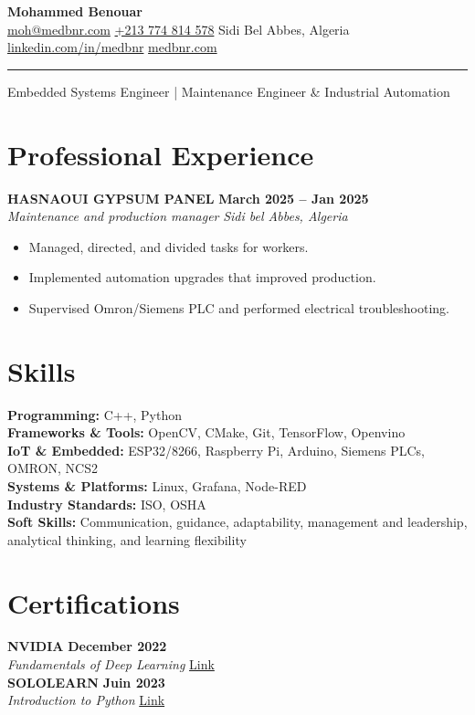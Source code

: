 \documentclass[11pt,a4paper]{article}
\begin{document}
\noindent
{\LARGE \textbf{Mohammed Benouar}} \\[0.3em]
\href{mailto:moh@medbnr.com}{moh@medbnr.com} \textbar{} 
\href{tel:+213774814578}{+213 774 814 578} \textbar{} 
Sidi Bel Abbes, Algeria \textbar{} 
\href{https://www.linkedin.com/in/medbnr/}{linkedin.com/in/medbnr} \textbar{} 
\href{https://medbnr.com}{medbnr.com}
\\[-.5em]\rule{\textwidth}{0.1pt}
Embedded Systems Engineer | Maintenance Engineer \& Industrial Automation




\section*{Professional Experience}
\textbf{HASNAOUI GYPSUM PANEL}
\hfill
\textbf{March 2025 – Jan 2025}
\\
\hfill
\textit{Maintenance and production manager}
\hfill
\textit{Sidi bel Abbes, Algeria}
\begin{itemize}[leftmargin=1.5em, nosep]
  \item Managed, directed, and divided tasks for workers.
  \item Implemented automation upgrades that improved production.
  \item Supervised Omron/Siemens PLC and performed electrical troubleshooting.
  
\end{itemize}




\section*{Skills}
\textbf{Programming:} C++, Python \\
\textbf{Frameworks \& Tools:}  OpenCV, CMake, Git, TensorFlow, Openvino \\
\textbf{IoT \& Embedded:} ESP32/8266, Raspberry Pi, Arduino, Siemens PLCs, OMRON, NCS2  \\
\textbf{Systems \& Platforms:} Linux, Grafana, Node-RED \\
\textbf{Industry Standards:} ISO, OSHA\\
\textbf{Soft Skills:} Communication, guidance, adaptability, management and leadership, analytical thinking, and learning flexibility




\section*{Certifications}
\textbf{NVIDIA}
\hfill
\textbf{December 2022}
\\
\hfill
\textit{Fundamentals of Deep Learning}
\href{https://courses.nvidia.com/certificates/bb284efe6de4435a9babb88a2a6b9b06/}{Link}
\\[0.8cm]
\textbf{SOLOLEARN}
\hfill
\textbf{Juin 2023}
\\
\hfill
\textit{Introduction to Python}
\href{https://www.sololearn.com/certificates/CC-OSCALKZP}{Link}
\end{document}
